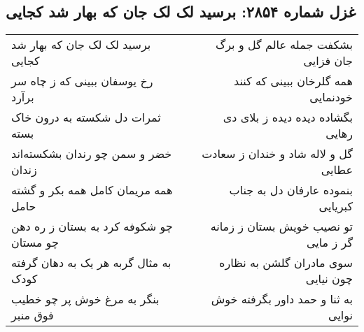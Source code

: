 \begin{center}
\section*{غزل شماره ۲۸۵۴: برسید لک لک جان که بهار شد کجایی}
\label{sec:2854}
\begin{longtable}{l p{0.5cm} r}
برسید لک لک جان که بهار شد کجایی
&&
بشکفت جمله عالم گل و برگ جان فزایی
\\
رخ یوسفان ببینی که ز چاه سر برآرد
&&
همه گلرخان ببینی که کنند خودنمایی
\\
ثمرات دل شکسته به درون خاک بسته
&&
بگشاده دیده دیده ز بلای دی رهایی
\\
خضر و سمن چو رندان بشکسته‌اند زندان
&&
گل و لاله شاد و خندان ز سعادت عطایی
\\
همه مریمان کامل همه بکر و گشته حامل
&&
بنموده عارفان دل به جناب کبریایی
\\
چو شکوفه کرد به بستان ز ره دهن چو مستان
&&
تو نصیب خویش بستان ز زمانه گر ز مایی
\\
به مثال گربه هر یک به دهان گرفته کودک
&&
سوی مادران گلشن به نظاره چون نیایی
\\
بنگر به مرغ خوش پر چو خطیب فوق منبر
&&
به ثنا و حمد داور بگرفته خوش نوایی
\\
\end{longtable}
\end{center}
